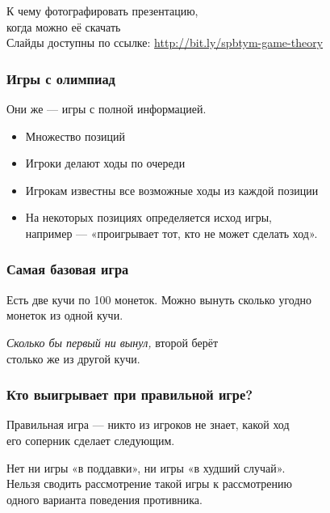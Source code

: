 \begin{frame} \begin{center}
	{\Large К чему фотографировать презентацию,\smallskip\\
		когда можно её скачать} \\ [0.9cm]
	{\small Слайды доступны по ссылке: \url{http://bit.ly/spbtym-game-theory}}
\end{center} \end{frame}



\begin{frame} \frametitle{Игры с олимпиад}
	Они же — игры с полной информацией.

\begin{itemize} \itemsep=2.25mm
	\item Множество позиций
	\item Игроки делают ходы по очереди
	\item Игрокам известны все возможные ходы из каждой позиции
	\item На некоторых позициях определяется исход игры, \\
		например — «проигрывает тот, кто не может сделать ход».
\end{itemize}
\end{frame}

\begin{frame} \frametitle{Самая базовая игра}
	Есть две кучи по 100 монеток. Можно вынуть сколько угодно \\
	монеток из одной кучи.
	\medskip \pause

\begin{center}  \end{center}\medskip

	{\it Сколько бы первый ни вынул,} второй берёт \\
	столько же из другой кучи.
\end{frame}

\begin{frame} \frametitle{Кто выигрывает при правильной игре?}
	Правильная игра — никто из игроков не знает, какой ход \\
	его соперник сделает следующим. \bigskip
	
	Нет ни игры «в поддавки», ни игры «в худший случай». \\
	Нельзя сводить рассмотрение такой игры к рассмотрению \\
	одного варианта поведения противника.
\end{frame}

